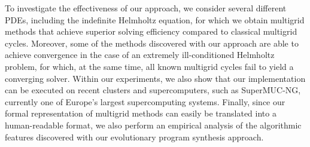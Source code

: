 To investigate the effectiveness of our approach, we consider several different PDEs, including the indefinite Helmholtz equation, for which we obtain multigrid methods that achieve superior solving efficiency compared to classical multigrid cycles.
Moreover, some of the methods discovered with our approach are able to achieve convergence in the case of an extremely ill-conditioned Helmholtz problem, for which, at the same time, all known multigrid cycles fail to yield a converging solver.
Within our experiments, we also show that our implementation can be executed on recent clusters and supercomputers, such as SuperMUC-NG, currently one of Europe's largest supercomputing systems.
Finally, since our formal representation of multigrid methods can easily be translated into a human-readable format, we also perform an empirical analysis of the algorithmic features discovered with our evolutionary program synthesis approach.